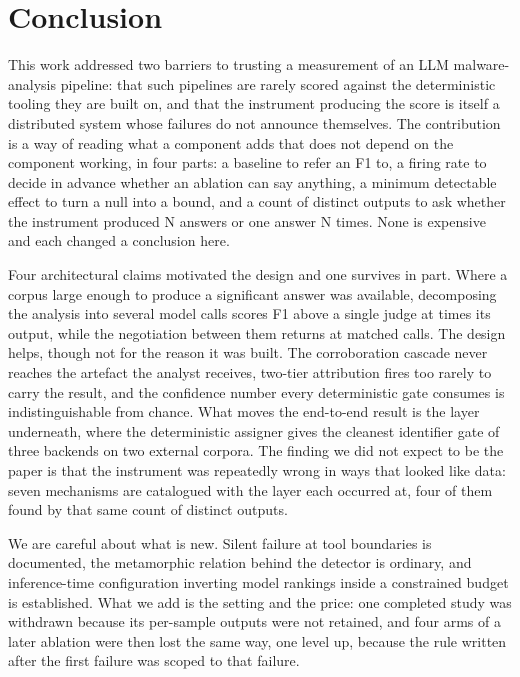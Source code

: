 \section{Conclusion}
\label{sec:conclusion}

This work addressed two barriers to trusting a measurement of an LLM malware-analysis pipeline: that
such pipelines are rarely scored against the deterministic tooling they are built on, and that the
instrument producing the score is itself a distributed system whose failures do not announce
themselves. The contribution is a way of reading what a component adds that does not depend on the
component working, in four parts: a baseline to refer an F1 to, a firing rate to decide in advance
whether an ablation can say anything, a minimum detectable effect to turn a null into a bound, and a
count of distinct outputs to ask whether the instrument produced N answers or one answer N times.
None is expensive and each changed a conclusion here.

Four architectural claims motivated the design and one survives in part. Where a corpus large enough
to produce a significant answer was available, decomposing the analysis into several model calls
scores  F1 above a single judge at
 times its output, while the negotiation between them returns
 at matched calls. The design helps, though not for the reason it was built. The corroboration cascade never reaches the artefact the analyst receives, two-tier attribution
fires too rarely to carry the result, and the confidence number every deterministic gate consumes is
indistinguishable from chance. What moves the end-to-end result is the layer underneath, where the
deterministic assigner gives the cleanest identifier gate of three backends on two external corpora.
The finding we did not expect to be the paper is that the instrument was repeatedly wrong in ways
that looked like data: seven mechanisms are catalogued with the layer each occurred at, four of them
found by that same count of distinct outputs.

We are careful about what is new. Silent failure at tool boundaries is documented, the metamorphic
relation behind the detector is ordinary, and inference-time configuration inverting model rankings
inside a constrained budget is established. What we add is the setting and the price: one completed
study was withdrawn because its per-sample outputs were not retained, and four arms of a later
ablation were then lost the same way, one level up, because the rule written after the first failure
was scoped to that failure.

